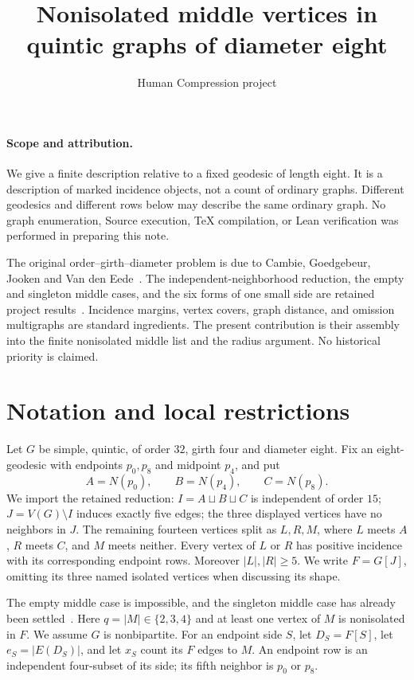 \documentclass[11pt]{article}
\title{Nonisolated middle vertices in quintic graphs of diameter eight}
\author{Human Compression project}
\date{}
\newcommand{\sq}{\sqcup}
\begin{document}
\maketitle

\paragraph{Scope and attribution.}
We give a finite description relative to a fixed geodesic of length eight.
It is a description of marked incidence objects, not a count of ordinary
graphs. Different geodesics and different rows below may describe the same
ordinary graph. No graph enumeration, Source execution, TeX compilation,
or Lean verification was performed in preparing this note.

The original order--girth--diameter problem is due to Cambie, Goedgebeur,
Jooken and Van den Eede~\cite{cages}. The independent-neighborhood reduction,
the empty and singleton middle cases, and the six forms of one small side
are retained project results~\cite{middle}. Incidence margins, vertex
covers, graph distance, and omission multigraphs are standard ingredients.
The present contribution is their assembly into the finite nonisolated
middle list and the radius argument. No historical priority is claimed.

\section{Notation and local restrictions}

Let $G$ be simple, quintic, of order $32$, girth four and diameter eight.
Fix an eight-geodesic with endpoints $p_0,p_8$ and midpoint $p_4$, and put
\[
 A=N(p_0),\qquad B=N(p_4),\qquad C=N(p_8).
\]
We import the retained reduction: $I=A\sq B\sq C$ is independent of order
$15$; $J=V(G)\setminus I$ induces exactly five edges; the three displayed
vertices have no neighbors in $J$. The remaining fourteen vertices split
as $L,R,M$, where $L$ meets $A$, $R$ meets $C$, and $M$ meets neither.
Every vertex of $L$ or $R$ has positive incidence with its corresponding
endpoint rows. Moreover $|L|,|R|\geq5$. We write $F=G[J]$, omitting its
three named isolated vertices when discussing its shape.

The empty middle case is impossible, and the singleton middle case has
already been settled~\cite{middle}. Here $q=|M|\in\{2,3,4\}$ and at least
one vertex of $M$ is nonisolated in $F$. We assume $G$ is nonbipartite.
For an endpoint side $S$, let $D_S=F[S]$, let $e_S=|E(D_S)|$, and let
$x_S$ count its $F$ edges to $M$. An endpoint row is an independent
four-subset of its side; its fifth neighbor is $p_0$ or $p_8$.
\end{document}
